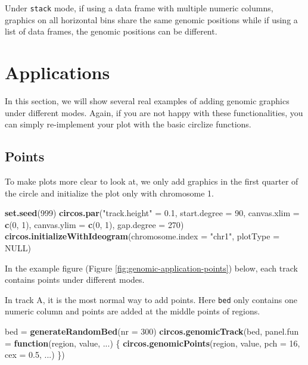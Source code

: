 \documentclass[]{book}
\newenvironment{Shaded}{\begin{snugshade}}{\end{snugshade}}
\newcommand{\KeywordTok}[1]{\textcolor[rgb]{0.13,0.29,0.53}{\textbf{#1}}}
\newcommand{\DataTypeTok}[1]{\textcolor[rgb]{0.13,0.29,0.53}{#1}}
\newcommand{\DecValTok}[1]{\textcolor[rgb]{0.00,0.00,0.81}{#1}}
\newcommand{\FloatTok}[1]{\textcolor[rgb]{0.00,0.00,0.81}{#1}}
\newcommand{\StringTok}[1]{\textcolor[rgb]{0.31,0.60,0.02}{#1}}
\newcommand{\OtherTok}[1]{\textcolor[rgb]{0.56,0.35,0.01}{#1}}
\newcommand{\ControlFlowTok}[1]{\textcolor[rgb]{0.13,0.29,0.53}{\textbf{#1}}}
\newcommand{\NormalTok}[1]{#1}
\theoremstyle{definition}
\theoremstyle{definition}
\theoremstyle{remark}
\begin{document}
Under \texttt{stack} mode, if using a data frame with multiple numeric
columns, graphics on all horizontal bins share the same genomic
positions while if using a list of data frames, the genomic positions
can be different.

\section{Applications}\label{applications}

In this section, we will show several real examples of adding genomic
graphics under different modes. Again, if you are not happy with these
functionalities, you can simply re-implement your plot with the basic
circlize functions.

\subsection{Points}\label{modes-points}

To make plots more clear to look at, we only add graphics in the first
quarter of the circle and initialize the plot only with chromosome 1.

\begin{Shaded}
\begin{Highlighting}[]
\KeywordTok{set.seed}\NormalTok{(}\DecValTok{999}\NormalTok{)}
\KeywordTok{circos.par}\NormalTok{(}\StringTok{"track.height"}\NormalTok{ =}\StringTok{ }\FloatTok{0.1}\NormalTok{, }\DataTypeTok{start.degree =} \DecValTok{90}\NormalTok{,}
    \DataTypeTok{canvas.xlim =} \KeywordTok{c}\NormalTok{(}\DecValTok{0}\NormalTok{, }\DecValTok{1}\NormalTok{), }\DataTypeTok{canvas.ylim =} \KeywordTok{c}\NormalTok{(}\DecValTok{0}\NormalTok{, }\DecValTok{1}\NormalTok{), }\DataTypeTok{gap.degree =} \DecValTok{270}\NormalTok{)}
\KeywordTok{circos.initializeWithIdeogram}\NormalTok{(}\DataTypeTok{chromosome.index =} \StringTok{"chr1"}\NormalTok{, }\DataTypeTok{plotType =} \OtherTok{NULL}\NormalTok{)}
\end{Highlighting}
\end{Shaded}

In the example figure (Figure \ref{fig:genomic-application-points})
below, each track contains points under different modes.

In track A, it is the most normal way to add points. Here \texttt{bed}
only contains one numeric column and points are added at the middle
points of regions.

\begin{Shaded}
\begin{Highlighting}[]
\NormalTok{bed =}\StringTok{ }\KeywordTok{generateRandomBed}\NormalTok{(}\DataTypeTok{nr =} \DecValTok{300}\NormalTok{)}
\KeywordTok{circos.genomicTrack}\NormalTok{(bed, }\DataTypeTok{panel.fun =} \ControlFlowTok{function}\NormalTok{(region, value, ...) \{}
    \KeywordTok{circos.genomicPoints}\NormalTok{(region, value, }\DataTypeTok{pch =} \DecValTok{16}\NormalTok{, }\DataTypeTok{cex =} \FloatTok{0.5}\NormalTok{, ...)}
\NormalTok{\})}
\end{Highlighting}
\end{Shaded}
\end{document}
